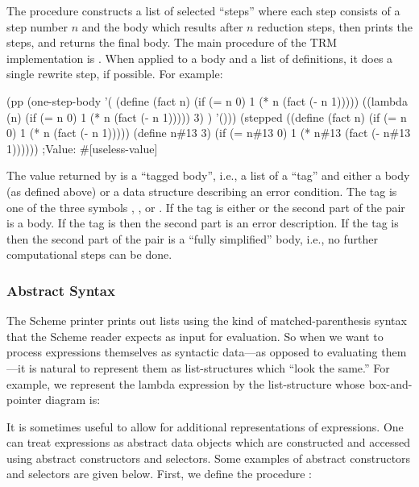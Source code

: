 The procedure  constructs a list of selected ``steps''
where each step consists of a step number $n$ and the body which
results after $n$ reduction steps, then prints the steps, and returns
the final body.  The main procedure of the TRM implementation is
.  When applied to a body and a list of
definitions, it does a single rewrite step, if possible.  For example:

\beginlispbig
(pp 
 (one-step-body
  '(
    (define (fact n)
      (if (= n 0)
          1
          (* n (fact (- n 1)))))
    ((lambda (n)
       (if (= n 0)
           1
           (* n (fact (- n 1)))))
     3)
    )
  '()))
(stepped
 ((define (fact n)
    (if (= n 0)
        1
        (* n (fact (- n 1)))))
  (define n\#13 3)
  (if (= n\#13 0)
      1
      (* n\#13 (fact (- n\#13 1))))))
;Value: \#[useless-value]
\endlisp

The value returned by  is a ``tagged body'', i.e.,
a list of a ``tag'' and either a body (as defined above) or a data
structure describing an error condition.  The tag is one of the three
symbols , , or .  If the tag is
either  or  the second part of the pair is a
body.  If the tag is  then the second part is an error
description.  If the tag is  then the second part of the
pair is a ``fully simplified'' body, i.e., no further computational
steps can be done.

\subsubsection{Abstract Syntax}

The Scheme printer prints out lists using the kind of
matched-parenthesis syntax that the Scheme reader expects as input for
evaluation.  So when we want to process expressions themselves as
syntactic data---as opposed to evaluating them---it is natural to
represent them as list-structures which ``look the same.''  For example,
we represent the lambda expression  by
the list-structure whose box-and-pointer diagram is:

\begin{figure}[hbtp]
\end{figure}

It is sometimes useful to allow for additional representations of
expressions.  One can treat expressions as abstract data objects which
are constructed and accessed using abstract constructors and
selectors.  Some examples of abstract constructors and selectors are
given below.  First, we define the procedure :

